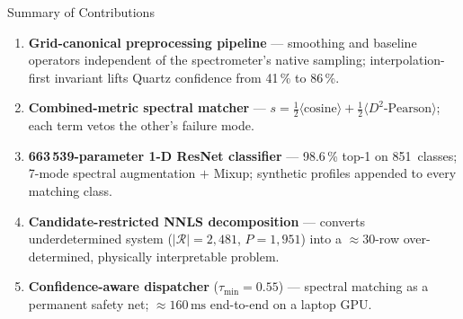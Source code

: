 \documentclass[aspectratio=169,10pt]{beamer}
\begin{document}
\begin{frame}{Summary of Contributions}
  \begin{enumerate}\setlength\itemsep{0.20cm}\small
    \item \textbf{Grid-canonical preprocessing pipeline} ---
          smoothing and baseline operators independent of the spectrometer's
          native sampling; interpolation-first invariant lifts Quartz
          confidence from 41\,\% to 86\,\%.

    \item \textbf{Combined-metric spectral matcher} ---
          $s=\tfrac{1}{2}\langle\text{cosine}\rangle
            +\tfrac{1}{2}\langle D^2\text{-Pearson}\rangle$;
          each term vetos the other's failure mode.

    \item \textbf{663\,539-parameter 1-D ResNet classifier} ---
          98.6\,\% top-1 on 851~classes; 7-mode spectral augmentation
          $+$ Mixup; synthetic profiles appended to every matching class.

    \item \textbf{Candidate-restricted NNLS decomposition} ---
          converts underdetermined system
          ($|\mathcal{R}|{=}2{,}481$,\; $P{=}1{,}951$)
          into a $\approx30$-row over-determined,
          physically interpretable problem.

    \item \textbf{Confidence-aware dispatcher} ($\tau_{\min}=0.55$) ---
          spectral matching as a permanent safety net;
          $\approx160\,\text{ms}$ end-to-end on a laptop GPU.
  \end{enumerate}
\end{frame}
\end{document}
